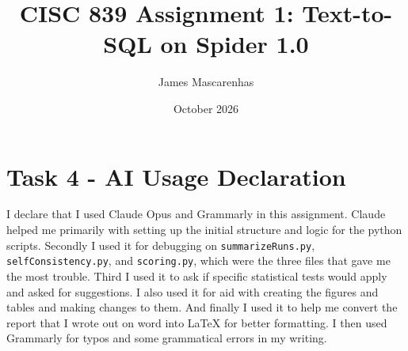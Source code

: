 \documentclass[11pt]{article}
\title{CISC 839 Assignment 1: Text-to-SQL on Spider 1.0}
\author{James Mascarenhas}
\date{October 2026}
\begin{document}
\maketitle
\thispagestyle{empty}



\FloatBarrier
\clearpage
\section*{Task 4 - AI Usage Declaration}
I declare that I used Claude Opus and Grammarly in this assignment. Claude helped me primarily with setting up the initial structure and logic for the python scripts. Secondly I used it for debugging on \texttt{summarizeRuns.py}, \texttt{selfConsistency.py}, and \texttt{scoring.py}, which were the three files that gave me the most trouble. Third I used it to ask if specific statistical tests would apply and asked for suggestions. I also used it for aid with creating the figures and tables and making changes to them. And finally I used it to help me convert the report that I wrote out on word into LaTeX for better formatting. I then used Grammarly for typos and some grammatical errors in my writing.

\FloatBarrier
\clearpage
\nocite{yu2018spider,zhong2020testsuite,rajkumar2022evaluating,hui2024qwen25coder,yang2025qwen3,qwen2024awqcard,lin2024awq,mcnemar1947,dietterich1998,wilson1927,holm1979,miller2024errorbars,wang2023selfconsistency,hassid2025overthink,kim2025flex,chen2025reasoning,marjanovic2025thoughtology,wang2025underthinking,ling2026neuralcot,muennighoff2025s1,kwon2023vllm,qwen2025qwen3card,dong2023c3}



\clearpage
\appendix

\end{document}
